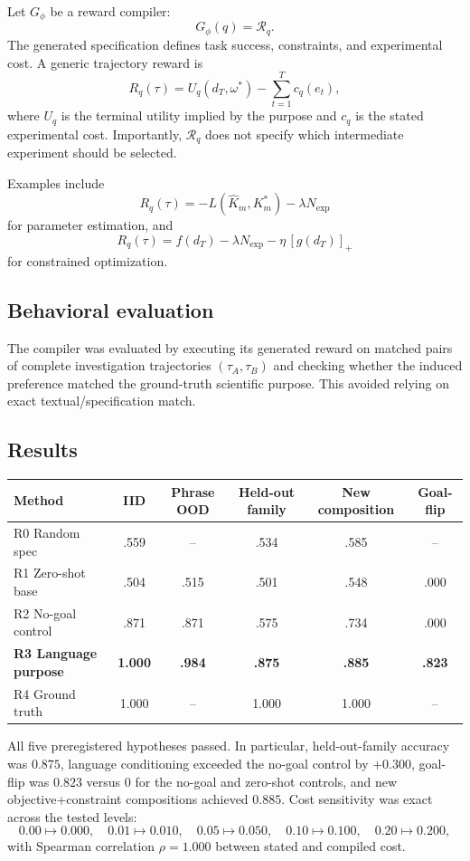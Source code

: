 \documentclass[11pt]{article}
\newcommand{\R}{\mathcal{R}}
\begin{document}
Let $G_\phi$ be a reward compiler:
\[
G_\phi(q)=\R_q.
\]
The generated specification defines task success, constraints, and experimental cost. A generic trajectory reward is
\[
R_q(\tau)
=U_q(d_T,\omega^*)-\sum_{t=1}^{T}c_q(e_t),
\]
where $U_q$ is the terminal utility implied by the purpose and $c_q$ is the stated experimental cost. Importantly, $\R_q$ does not specify which intermediate experiment should be selected.

Examples include
\[
R_q(\tau)
=-L(\widehat K_m,K_m^*)-\lambda N_{\mathrm{exp}}
\]
for parameter estimation, and
\[
R_q(\tau)
=f(d_T)-\lambda N_{\mathrm{exp}}-\eta\,[g(d_T)]_+
\]
for constrained optimization.

\subsection{Behavioral evaluation}
The compiler was evaluated by executing its generated reward on matched pairs of complete investigation trajectories $(\tau_A,\tau_B)$ and checking whether the induced preference matched the ground-truth scientific purpose. This avoided relying on exact textual/specification match.

\subsection{Results}
\begin{center}
\small
\begin{tabular}{lccccc}
\toprule
Method & IID & Phrase OOD & Held-out family & New composition & Goal-flip\\
\midrule
R0 Random spec & .559 & -- & .534 & .585 & --\\
R1 Zero-shot base & .504 & .515 & .501 & .548 & .000\\
R2 No-goal control & .871 & .871 & .575 & .734 & .000\\
\textbf{R3 Language purpose} & \textbf{1.000} & \textbf{.984} & \textbf{.875} & \textbf{.885} & \textbf{.823}\\
R4 Ground truth & 1.000 & -- & 1.000 & 1.000 & --\\
\bottomrule
\end{tabular}
\end{center}
All five preregistered hypotheses passed. In particular, held-out-family accuracy was $0.875$, language conditioning exceeded the no-goal control by $+0.300$, goal-flip was $0.823$ versus $0$ for the no-goal and zero-shot controls, and new objective+constraint compositions achieved $0.885$. Cost sensitivity was exact across the tested levels:
\[
0.00\mapsto0.000,\quad
0.01\mapsto0.010,\quad
0.05\mapsto0.050,\quad
0.10\mapsto0.100,\quad
0.20\mapsto0.200,
\]
with Spearman correlation $\rho=1.000$ between stated and compiled cost.
\end{document}
